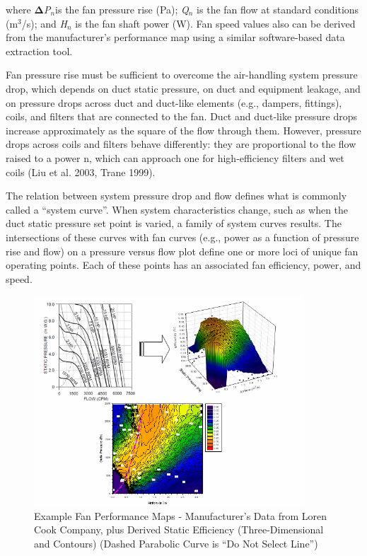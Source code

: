 where \textbf{Δ}\emph{P\(_{n}\)}is the fan pressure rise (Pa); \emph{Q\(_{n}\)} is the fan flow at standard conditions (m\(^{3}\)/s); and \emph{H\(_{n}\)} is the fan shaft power (W). Fan speed values also can be derived from the manufacturer's performance map using a similar software-based data extraction tool.

Fan pressure rise must be sufficient to overcome the air-handling system pressure drop, which depends on duct static pressure, on duct and equipment leakage, and on pressure drops across duct and duct-like elements (e.g., dampers, fittings), coils, and filters that are connected to the fan. Duct and duct-like pressure drops increase approximately as the square of the flow through them. However, pressure drops across coils and filters behave differently: they are proportional to the flow raised to a power n, which can approach one for high-efficiency filters and wet coils (Liu et al. 2003, Trane 1999).

The relation between system pressure drop and flow defines what is commonly called a ``system curve''. When system characteristics change, such as when the duct static pressure set point is varied, a family of system curves results. The intersections of these curves with fan curves (e.g., power as a function of pressure rise and flow) on a pressure versus flow plot define one or more loci of unique fan operating points. Each of these points has an associated fan efficiency, power, and speed.

\begin{figure}[hbtp] %
\centering
\includegraphics[width=0.9\textwidth, height=0.9\textheight, keepaspectratio=true]{media/image4888.png}
\caption{Example Fan Performance Maps - Manufacturer’s Data from Loren Cook Company, plus Derived Static Efficiency (Three-Dimensional and Contours) (Dashed Parabolic Curve is “Do Not Select Line”) \protect \label{fig:example-fan-performance-maps-manufacturers}}
\end{figure}

